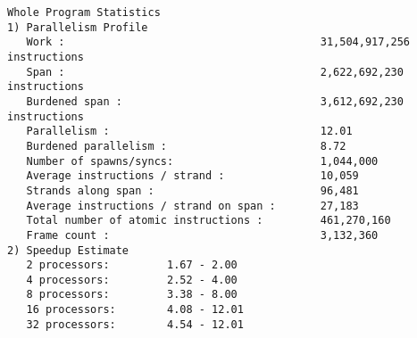 \documentclass[12pt]{article}
\begin{document}
\begin{verbatim}
Whole Program Statistics
1) Parallelism Profile
   Work :                                        31,504,917,256 instructions
   Span :                                        2,622,692,230 instructions
   Burdened span :                               3,612,692,230 instructions
   Parallelism :                                 12.01
   Burdened parallelism :                        8.72
   Number of spawns/syncs:                       1,044,000
   Average instructions / strand :               10,059
   Strands along span :                          96,481
   Average instructions / strand on span :       27,183
   Total number of atomic instructions :         461,270,160
   Frame count :                                 3,132,360
2) Speedup Estimate
   2 processors:         1.67 - 2.00
   4 processors:         2.52 - 4.00
   8 processors:         3.38 - 8.00
   16 processors:        4.08 - 12.01
   32 processors:        4.54 - 12.01
\end{verbatim}
\end{document}
